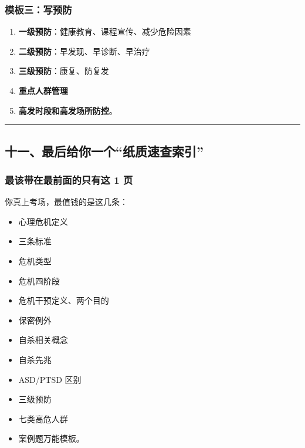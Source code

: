\documentclass[
  a4paper,
]{ctexart}
\providecommand{\tightlist}{%
  \setlength{\itemsep}{0pt}\setlength{\parskip}{0pt}}
\begin{document}
\subsubsection{模板三：写预防}\label{ux6a21ux677fux4e09ux5199ux9884ux9632}

\begin{enumerate}
\def\labelenumi{\arabic{enumi}.}
\tightlist
\item
  \textbf{一级预防}：健康教育、课程宣传、减少危险因素
\item
  \textbf{二级预防}：早发现、早诊断、早治疗
\item
  \textbf{三级预防}：康复、防复发
\item
  \textbf{重点人群管理}
\item
  \textbf{高发时段和高发场所防控}。
\end{enumerate}

\begin{center}\rule{0.5\linewidth}{0.5pt}\end{center}

\subsection{十一、最后给你一个``纸质速查索引''}\label{ux5341ux4e00ux6700ux540eux7ed9ux4f60ux4e00ux4e2aux7eb8ux8d28ux901fux67e5ux7d22ux5f15}

\subsubsection{最该带在最前面的只有这 1
页}\label{ux6700ux8be5ux5e26ux5728ux6700ux524dux9762ux7684ux53eaux6709ux8fd9-1-ux9875}

你真上考场，最值钱的是这几条：

\begin{itemize}
\tightlist
\item
  心理危机定义
\item
  三条标准
\item
  危机类型
\item
  危机四阶段
\item
  危机干预定义、两个目的
\item
  保密例外
\item
  自杀相关概念
\item
  自杀先兆
\item
  ASD/PTSD 区别
\item
  三级预防
\item
  七类高危人群
\item
  案例题万能模板。
\end{itemize}
\end{document}
